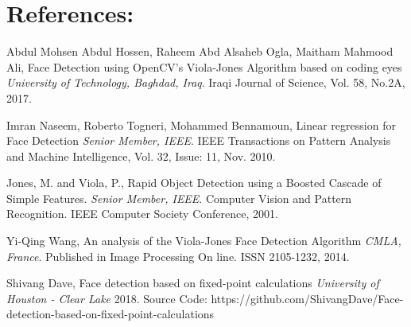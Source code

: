 \documentclass[12pt]{elsarticle}
\begin{document}
\section{References:}
\label{S:7}
\begin{thebibliography}{999}

	  Abdul Mohsen Abdul Hossen, Raheem Abd Alsaheb Ogla, Maitham Mahmood Ali, Face Detection using OpenCV's Viola-Jones Algorithm based on coding eyes
  	  \emph{University of Technology, Baghdad, Iraq}.
  	  Iraqi Journal of Science,
	  Vol. 58, No.2A,
  	  2017.
      
	  Imran Naseem, Roberto Togneri, Mohammed Bennamoun, Linear regression for Face Detection
  	  \emph{Senior Member, IEEE}.
  	  IEEE Transactions on Pattern Analysis and Machine Intelligence,
	  Vol. 32, Issue: 11,
  	  Nov. 2010.
      
	  Jones, M. and Viola, P., Rapid Object Detection using a Boosted Cascade of Simple Features.
  	  \emph{Senior Member, IEEE}.
  	  Computer Vision and Pattern Recognition. IEEE Computer Society Conference,
  	  2001.
      
	  Yi-Qing Wang, An analysis of the Viola-Jones Face Detection Algorithm
  	  \emph{CMLA, France}.
  	  Published in Image Processing On line. ISSN 2105-1232,
  	  2014.
      
	  Shivang Dave, Face detection based on fixed-point calculations
  	  \emph{University of Houston - Clear Lake}
  	  2018.
      Source Code: https://github.com/ShivangDave/Face-detection-based-on-fixed-point-calculations
      
\end{thebibliography}
\end{document}
